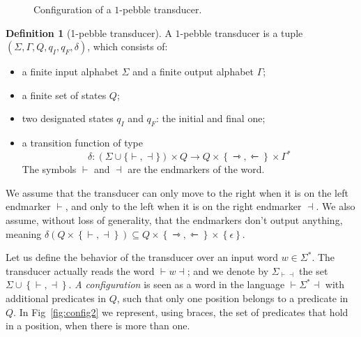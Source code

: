 \documentclass[sigplan,review,anonymous]{acmart}\settopmatter{printfolios=true,printccs=false,printacmref=false}
\newcommand{\set}[1]{\left\{#1 \right\}}
\newcommand{\mleft}{\leftarrowtriangle}
\newcommand{\mright}{\rightarrowtriangle}
\theoremstyle{definition}
\newtheorem{definition}[theorem]{Definition}
\theoremstyle{remark}
\begin{document}
\begin{figure}[h!]
  \centering

\caption{Configuration of a $1$-pebble transducer.}
\label{fig:config}

\end{figure}

\begin{definition}[1-pebble transducer]\label{def:1pebble}
A $1$-pebble transducer is a tuple $(\Sigma,\Gamma, Q, q_I, q_F, \delta)$, which consists of:
\begin{itemize}
\item a finite input alphabet $\Sigma$ and a finite output alphabet $\Gamma$; 
\item a finite set of states $Q$;
\item two designated states $q_I$ and $q_F$: the initial and final one;
\item  a transition function of type  $$\delta : (\Sigma\cup\{\vdash,\dashv\}) \times Q \to Q\times\set{\mright,\mleft}\times\Gamma^*$$
The symbols  $\vdash$ and $\dashv$ are the endmarkers of the word. 
\end{itemize}
We assume that the transducer can only move to the right when it is on the left endmarker $\vdash$, and only to the left when  it is on the right endmarker $\dashv$. We also assume, without loss of generality, that the endmarkers don't output anything, meaning  $\delta(Q\times\set{\vdash,\dashv})\subseteq Q\times\set{\mright,\mleft}\times \set{\epsilon}$.
 \end{definition}
Let us define the behavior of the transducer over an input word $w\in\Sigma^*$.
The transducer actually reads the word ${\vdash} w{\dashv}$; and we denote by $\Sigma_{\vdash\dashv}$ the set  $\Sigma\cup\set{\vdash,\dashv}$.
\emph{A configuration} is seen as a word in the language ${\vdash}\Sigma^*{\dashv}$ with additional predicates in $Q$, such that only one position belongs to a predicate in $Q$. In Fig~\ref{fig:config2} we represent, using braces, the set of predicates that hold in a position, when there is more than one.
\end{document}
